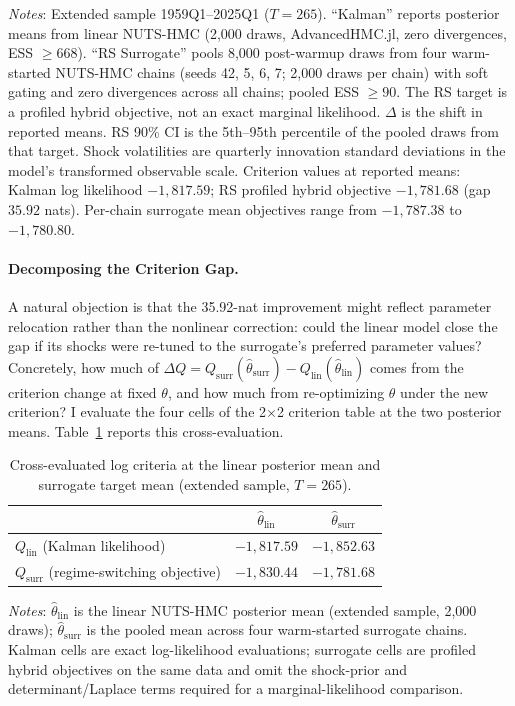 \documentclass[12pt]{article}
\theoremstyle{plain}
\theoremstyle{definition}
\theoremstyle{remark}
\newcommand{\tablenotes}[1]{%
  \par\vspace{0.5em}%
  \noindent\begin{minipage}{\textwidth}%
  \raggedright\footnotesize #1%
  \end{minipage}\par%
}
\begin{document}
\begin{table}[htbp]
\begin{tabular}{llrrrr}
\bottomrule
\end{tabular}
\tablenotes{\textit{Notes}: Extended sample 1959Q1--2025Q1 ($T=265$). ``Kalman'' reports posterior means from linear NUTS-HMC (2,000 draws, AdvancedHMC.jl, zero divergences, ESS $\geq 668$). ``RS Surrogate'' pools 8{,}000 post-warmup draws from four warm-started NUTS-HMC chains (seeds 42, 5, 6, 7; 2{,}000 draws per chain) with soft gating and zero divergences across all chains; pooled ESS $\geq 90$. The RS target is a profiled hybrid objective, not an exact marginal likelihood. $\Delta$ is the shift in reported means. RS 90\% CI is the 5th--95th percentile of the pooled draws from that target. Shock volatilities are quarterly innovation standard deviations in the model's transformed observable scale. Criterion values at reported means: Kalman log likelihood $-1{,}817.59$; RS profiled hybrid objective $-1{,}781.68$ (gap $35.92$ nats). Per-chain surrogate mean objectives range from $-1{,}787.38$ to $-1{,}780.80$.}
\end{table}

\paragraph{Decomposing the Criterion Gap.}
A natural objection is that the 35.92-nat improvement might reflect parameter relocation rather than the nonlinear correction: could the linear model close the gap if its shocks were re-tuned to the surrogate's preferred parameter values? Concretely, how much of $\Delta Q = Q_{\text{surr}}(\hat{\theta}_{\text{surr}}) - Q_{\text{lin}}(\hat{\theta}_{\text{lin}})$ comes from the criterion change at fixed $\theta$, and how much from re-optimizing $\theta$ under the new criterion? I evaluate the four cells of the 2$\times$2 criterion table at the two posterior means.
Table~\ref{tab:ll_decomposition} reports this cross-evaluation.

\begin{table}[htbp]
\centering
\caption{Cross-evaluated log criteria at the linear posterior mean and surrogate target mean (extended sample, $T=265$).}
\label{tab:ll_decomposition}
\begin{tabular}{lcc}
\toprule
& $\hat{\theta}_{\text{lin}}$ & $\hat{\theta}_{\text{surr}}$ \\
\midrule
$Q_{\text{lin}}$ (Kalman likelihood)            & $-1{,}817.59$ & $-1{,}852.63$ \\
$Q_{\text{surr}}$ (regime-switching objective) & $-1{,}830.44$ & $-1{,}781.68$ \\
\bottomrule
\end{tabular}
\smallskip
\tablenotes{\textit{Notes}: $\hat{\theta}_{\text{lin}}$ is the linear NUTS-HMC posterior mean (extended sample, 2{,}000 draws); $\hat{\theta}_{\text{surr}}$ is the pooled mean across four warm-started surrogate chains. Kalman cells are exact log-likelihood evaluations; surrogate cells are profiled hybrid objectives on the same data and omit the shock-prior and determinant/Laplace terms required for a marginal-likelihood comparison.}
\end{table}
\end{document}

